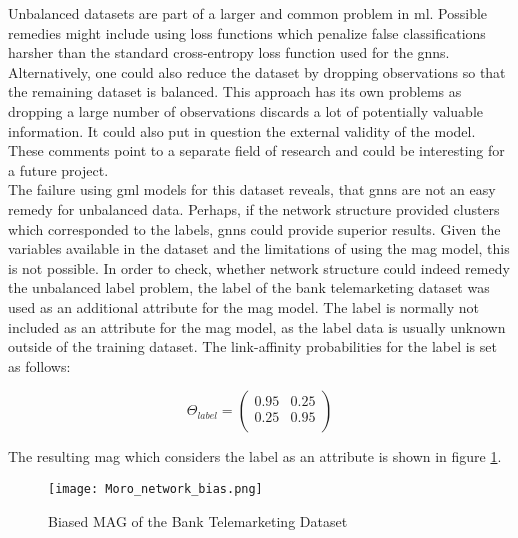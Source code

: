   \noindent Unbalanced datasets are part of a larger and common problem in 
  \acs{ml}. Possible remedies might include using loss functions which 
  penalize false classifications harsher than the standard cross-entropy loss 
  function used for the \acsp{gnn}. Alternatively, one could also reduce the 
  dataset by dropping observations so that the remaining dataset is balanced. 
  This approach has its own problems as dropping a large number of observations 
  discards a lot of potentially valuable information. It could also put in 
  question the external validity of the model. These comments point to a 
  separate field of research and could be interesting for a future project. \\

  \noindent The failure using \acs{gml} models for this dataset reveals, that 
  \acsp{gnn} are not an easy remedy for unbalanced data. Perhaps, if the
  network structure provided clusters which corresponded to the labels,
  \acsp{gnn} could provide superior results. Given the variables available in 
  the dataset and the limitations of using the \acs{mag} model, this is not 
  possible. In order to check, whether network structure could indeed remedy 
  the unbalanced label problem, the label of the bank telemarketing dataset was 
  used as an additional attribute for the \acs{mag} model. The label is 
  normally not included as an attribute for the \acs{mag} model, as the label 
  data is usually unknown outside of the training dataset. The link-affinity 
  probabilities for the label is set as follows:

  \[ \Theta_{label} = 
	\begin{pmatrix}
        0.95 & 0.25 \\
		0.25 & 0.95 \\
	\end{pmatrix}
	\] 
  
  \noindent The resulting \acs{mag} which considers the label as an attribute 
  is shown in figure \ref{fig:Moro_bias}.

  \begin{figure}[h]
		\centering
		\texttt{[image: Moro\_network\_bias.png]}
		\caption{Biased MAG of the Bank Telemarketing Dataset}
        \label{fig:Moro_bias}
  \end{figure}

